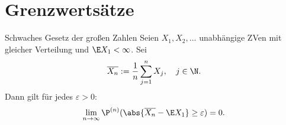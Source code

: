 \section*{Grenzwertsätze}

\begin{karte}{Schwaches Gesetz der großen Zahlen}
	Seien $X_1,X_2,\dotsc$ unabhängige ZVen mit gleicher Verteilung und $\E X_1 < \infty$. Sei 
	$$ \overline{X_n}:=\frac{1}{n}\sum_{j=1}^{n} X_j, \quad j \in \N.$$
	Dann gilt für jedes $\varepsilon > 0$:
	$$\lim\limits_{n \to \infty} \P^{(n)}(\abs{\overline{X_n}-\E X_1} \geq \varepsilon) = 0.$$
\end{karte}